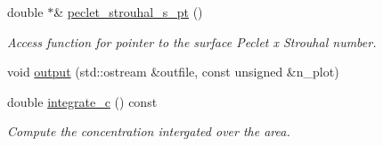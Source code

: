\begin{DoxyCompactItemize}
double $\ast$\& \hyperlink{classoomph_1_1SpineAxisymmetricMarangoniSurfactantFluidInterfaceElement_a943d445ebca59b8c2eeb6584eeba366e}{peclet\+\_\+strouhal\+\_\+s\+\_\+pt} ()
\begin{DoxyCompactList}\small\item\em Access function for pointer to the surface Peclet x Strouhal number. \end{DoxyCompactList}\item 
void \hyperlink{classoomph_1_1SpineAxisymmetricMarangoniSurfactantFluidInterfaceElement_ac69e8f0d0de52bcef7c2fa939c1ba2f1}{output} (std\+::ostream \&outfile, const unsigned \&n\+\_\+plot)
\item 
double \hyperlink{classoomph_1_1SpineAxisymmetricMarangoniSurfactantFluidInterfaceElement_aeb6b9fa726b084884c1e00291d077eea}{integrate\+\_\+c} () const
\begin{DoxyCompactList}\small\item\em Compute the concentration intergated over the area. \end{DoxyCompactList}\end{DoxyCompactItemize}
